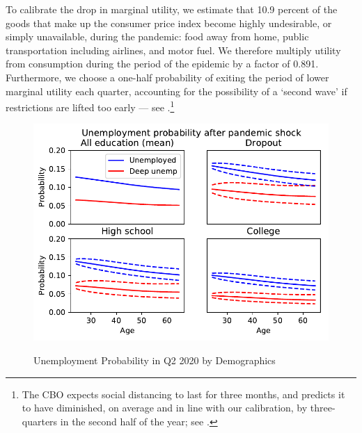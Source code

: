 \documentclass[titlepage]{\econtex}
\begin{document}
To calibrate the drop in marginal utility, we estimate that 10.9 percent of the goods that make up the consumer price index become highly undesirable, or simply unavailable, during the pandemic: food away from home, public transportation including airlines, and motor fuel.
We therefore multiply utility from consumption during the period of the epidemic by a factor of 0.891.
Furthermore, we choose a one-half probability of exiting the period of lower marginal utility each quarter, accounting for the possibility of a `second wave' if restrictions are lifted too early --- see \cite{cyranoski_we_2020}.\footnote{The CBO expects social distancing to last for three months, and predicts it to have diminished, on average and in line with our calibration, by three-quarters in the second half of the year; see \cite{SwagelCBO2020}.}

\begin{figure}
  \centering
  \caption{Unemployment Probability in Q2 2020 by Demographics}
  \label{unemployment_demographics}
  { \includegraphics[width=8in]{./Figures/UnempProbByDemogBasic}}
\end{figure}
\end{document}
